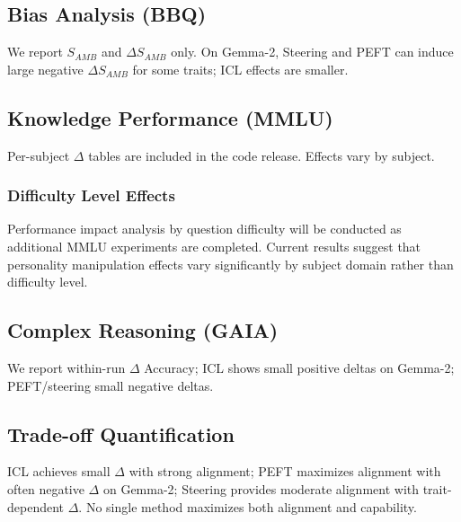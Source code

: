 \subsection{Bias Analysis (BBQ)}

We report \(S_{AMB}\) and \(\Delta S_{AMB}\) only. On Gemma-2, Steering and PEFT can induce large negative \(\Delta S_{AMB}\) for some traits; ICL effects are smaller.

\subsection{Knowledge Performance (MMLU)}

Per-subject \(\Delta\) tables are included in the code release. Effects vary by subject.

\subsubsection{Difficulty Level Effects}

Performance impact analysis by question difficulty will be conducted as additional MMLU experiments are completed. Current results suggest that personality manipulation effects vary significantly by subject domain rather than difficulty level.

\subsection{Complex Reasoning (GAIA)}

We report within-run \(\Delta\) Accuracy; ICL shows small positive deltas on Gemma-2; PEFT/steering small negative deltas.

\subsection{Trade-off Quantification}

ICL achieves small \(\Delta\) with strong alignment; PEFT maximizes alignment with often negative \(\Delta\) on Gemma-2; Steering provides moderate alignment with trait-dependent \(\Delta\). No single method maximizes both alignment and capability.
